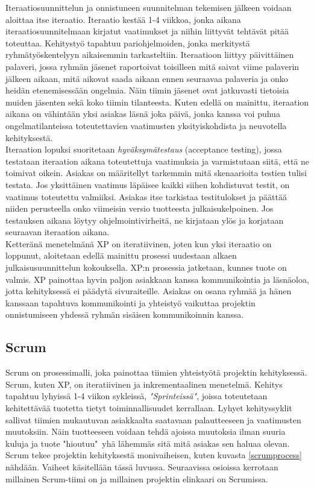 \documentclass[finnish]{../tktltiki2}
\theoremstyle{definition}
\theoremstyle{remark}
\begin{document}
Iteraatiosuunnittelun ja onnistuneen suunnitelman tekemisen jälkeen voidaan aloittaa itse iteraatio. Iteraatio kestää 1-4 viikkoa, jonka aikana iteraatiosuunnitelmaan kirjatut vaatimukset ja niihin liittyvät tehtävät pitää toteuttaa. Kehitystyö tapahtuu pariohjelmoiden, jonka
merkitystä ryhmätyöskentelyyn aikaisemmin tarkasteltiin. Iteraatioon liittyy päivittäinen palaveri, jossa ryhmän jäsenet raportoivat toisilleen mitä saivat viime palaverin jälkeen aikaan, mitä aikovat saada aikaan ennen seuraavaa palaveria ja onko heidän etenemisessään ongelmia. Näin tiimin jäsenet ovat jatkuvasti tietoisia
muiden jäsenten sekä koko tiimin tilanteesta. Kuten edellä on mainittu, iteraation aikana on vähintään yksi asiakas läsnä joka päivä, jonka kanssa voi puhua ongelmatilanteissa toteutettavien vaatimusten yksityiskohdista ja neuvotella kehityksestä.\\

Iteraation lopuksi suoritetaan \emph{hyväksymätestaus} (acceptance testing), jossa testataan iteraation aikana toteutettuja vaatimuksia ja varmistutaan siitä, että ne toimivat oikein. Asiakas on määritellyt tarkemmin mitä skenaarioita testien tulisi testata. Jos yksittäinen vaatimus läpäisee kaikki siihen kohdistuvat testit, on vaatimus toteutettu valmiiksi. Asiakas itse tarkistaa testitulokset ja päättää niiden perusteella onko viimeisin versio tuotteesta julkaisukelpoinen. Jos testauksen aikana löytyy ohjelmointivirheitä, ne kirjataan ylös ja korjataan seuraavan iteraation aikana.\\

Ketteränä menetelmänä XP on iteratiivinen, joten kun yksi iteraatio on loppunut, aloitetaan edellä mainittu prosessi uudestaan alkaen julkaisusuunnittelun kokouksella. XP:n prosessia jatketaan, kunnes tuote on valmis. XP painottaa hyvin paljon asiakkaan kanssa kommunikointia ja läsnäoloa, jotta kehityksessä ei päädytä sivuraiteille. Asiakas on osana ryhmää ja hänen kanssaan tapahtuva kommunikointi ja yhteistyö vaikuttaa projektin onnistumiseen yhdessä ryhmän sisäisen kommunikoinnin kanssa.

\subsection{Scrum}

Scrum on prosessimalli, joka painottaa tiimien yhteistyötä projektin 
kehityksessä. Scrum, kuten XP, on iteratiivinen 
ja inkrementaalinen menetelmä.
Kehitys tapahtuu lyhyissä 1-4 viikon sykleissä, 
\emph{"Sprinteissä"}, joissa toteutetaan kehitettävää tuotetta tietyt 
toiminnallisuudet kerrallaan. Lyhyet kehityssyklit sallivat tiimien 
mukautuvan asiakkaalta saatavaan palautteeseen ja vaatimusten 
muutoksiin. Näin tuotteeseen voidaan tehdä ajoissa
muutoksia ilman suuria kuluja ja tuote "hioutuu"~yhä lähemmäs sitä 
mitä asiakas sen haluaa olevan. Scrum tekee projektin kehityksestä
monivaiheisen, kuten kuvasta \ref{scrumprocess} nähdään. Vaiheet käsitellään tässä luvussa. Seuraavissa osioissa kerrotaan millainen Scrum-tiimi
on ja millainen projektin elinkaari on Scrumissa.
\end{document}
